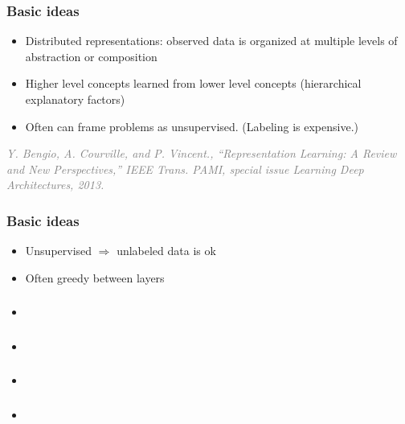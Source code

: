 \documentclass[t]{beamer}
\newcommand\smallgray[1]{\textcolor{gray}{\small\it #1}}
\newcommand\prevwork[1]{\smallgray{#1}}
\begin{document}
\begin{frame}
  \frametitle{Basic ideas}
  \begin{itemize}
  \item Distributed representations: observed data is organized at
    multiple levels of abstraction or composition
  \item Higher level concepts learned from lower level concepts
    (hierarchical explanatory factors)
  \item Often can frame problems as unsupervised.  (Labeling is
    expensive.)
  \end{itemize}
  
  \prevwork{Y. Bengio, A. Courville, and P. Vincent., ``Representation
    Learning: A Review and New Perspectives,'' IEEE Trans. PAMI,
    special issue Learning Deep Architectures, 2013.}
\end{frame}

\begin{frame}
  \frametitle{Basic ideas}
  \begin{itemize}
  \item Unsupervised $\Rightarrow$ unlabeled data is ok
  \item Often greedy between layers
  \end{itemize}
\end{frame}

\begin{frame}
  \frametitle{}
  \begin{itemize}
  \item 
  \end{itemize}
\end{frame}

\begin{frame}
  \frametitle{}
  \begin{itemize}
  \item 
  \end{itemize}
\end{frame}

\begin{frame}
  \frametitle{}
  \begin{itemize}
  \item 
  \end{itemize}
\end{frame}

\begin{frame}
  \frametitle{}
  \begin{itemize}
  \item 
  \end{itemize}
\end{frame}
\end{document}

